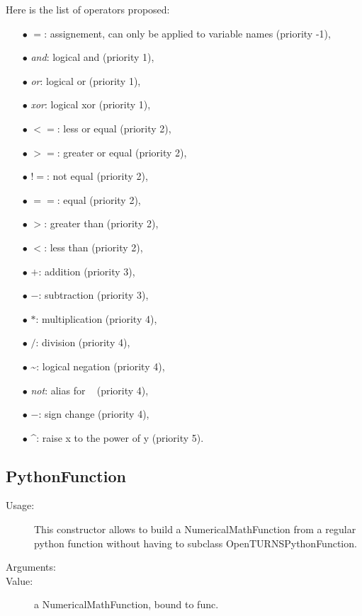Here is the list of operators proposed:
\begin{itemize}
\item[$\bullet$] $=$: assignement, can only be applied to variable names (priority -1),
\item[$\bullet$] \textit{and}: logical and (priority 1),
\item[$\bullet$] \textit{or}: logical or (priority 1),
\item[$\bullet$] \textit{xor}: logical xor (priority 1),
\item[$\bullet$] $<=$: less or equal (priority 2),
\item[$\bullet$] $>=$: greater or equal (priority 2),
\item[$\bullet$] $!=$: not equal (priority 2),
\item[$\bullet$] $==$: equal (priority 2),
\item[$\bullet$] $>$: greater than (priority 2),
\item[$\bullet$] $<$: less than (priority 2),
\item[$\bullet$] $+$: addition (priority 3),
\item[$\bullet$] $-$: subtraction (priority 3),
\item[$\bullet$] $*$: multiplication (priority 4),
\item[$\bullet$] $/$: division (priority 4),
\item[$\bullet$] \textasciitilde: logical negation (priority 4),
\item[$\bullet$] \textit{not}: alias for ~ (priority 4),
\item[$\bullet$] $-$: sign change (priority 4),
\item[$\bullet$] \textasciicircum: raise x to the power of y (priority 5).
\end{itemize}


\newpage
{}
\subsection{PythonFunction}
% 
\begin{description}
% 
\item[Usage:] This constructor allows to build a NumericalMathFunction from a regular python function without having to subclass OpenTURNSPythonFunction.
% 
\item[Arguments:] \rule{0pt}{1em}
\item[Value:] a NumericalMathFunction, bound to func.
\end{description}

